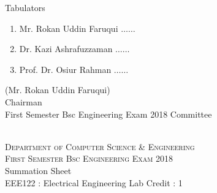 \documentclass[12pt]{article}
\begin{document}
            \begin{table}[hb]
            	\centering
            \begin{minipage}[b]{0.5\linewidth} %
            {\centering Tabulators }
            \begin{enumerate}
                \item Mr. Rokan Uddin Faruqui \hspace*{1ex} $\ldots \ldots  $  
                \item Dr. Kazi Ashrafuzzaman \hspace*{1ex} $\ldots \ldots  $  
                \item Prof. Dr. Osiur Rahman \hspace*{1ex} $\ldots \ldots $  
            \end{enumerate} 

            \end{minipage}
            \hspace*{1.2cm}
            \begin{minipage}[b]{0.4\linewidth} \centering
            (Mr. Rokan Uddin Faruqui) \\
            Chairman  \hspace*{1ex} \\
           First Semester Bsc Engineering Exam 2018 Committee
            \end{minipage}
            \end{table}
            \clearpage
    \centering
    \begin{minipage}[m]{.8\textwidth} \centering 
	\smallskip
	\\
	\textsc{Department of Computer Science \& Engineering}\\
	\textsc{ First Semester Bsc Engineering Exam 2018}\\
    {\large {\sc Summation Sheet}}\\  
     {\centering EEE122 : Electrical Engineering Lab     Credit : 1 } \\
    \end{minipage} 
\end{document}
